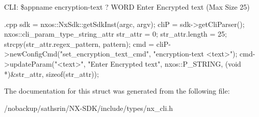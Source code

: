 CLI: \$appname encryption-\/text ? WORD Enter Encrypted text (Max Size 25)


\begin{DoxyCode}
 {.cpp}
       sdk = nxos::NxSdk::getSdkInst(argc, argv);
       cliP = sdk->getCliParser();
       nxos::cli_param_type_string_attr str_attr = {0};
       str_attr.length = 25;
       strcpy(str_attr.regex_pattern, pattern);
       cmd = cliP->newConfigCmd("set_encryption_text_cmd",
                                "encryption-text <text>");
       cmd->updateParam("<text>", "Enter Encrypted text", nxos::P_STRING,
                        (void *)&str_attr, sizeof(str_attr));
\end{DoxyCode}



 

The documentation for this struct was generated from the following file:\begin{DoxyCompactItemize}
\item 
/nobackup/sathsrin/NX-\/SDK/include/types/nx\_\-cli.h\end{DoxyCompactItemize}
